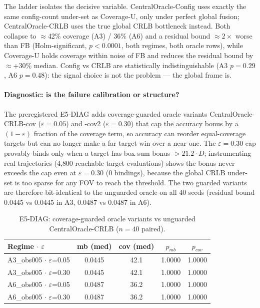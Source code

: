 \documentclass[journal]{IEEEtran}
\newcommand{\CU}{Coverage-U}
\begin{document}
The ladder isolates the decisive variable. CentralOracle-Config uses
exactly the same config-count under-set as \CU, only under perfect global
fusion; CentralOracle-CRLB uses the true global CRLB bottleneck instead. Both
collapse to $\approx$42\% coverage (A3) / 36\% (A6) and a residual bound
$\approx 2\times$ worse than FB (Holm-significant, $p < 0.0001$, both regimes,
both oracle rows), while \CU{} holds coverage within noise of FB and reduces
the residual bound by $\approx$+30\% median. Config vs CRLB are statistically
indistinguishable (A3 $p = 0.29$, A6 $p = 0.48$): the signal choice is not the
problem --- the global frame is.

\paragraph{Diagnostic: is the failure calibration or structure?}
The preregistered E5-DIAG adds coverage-guarded oracle variants
CentralOracle-CRLB-cov ($\varepsilon = 0.05$) and -cov2 ($\varepsilon = 0.30$)
that cap the accuracy bonus by a $(1 - \varepsilon)$ fraction of the coverage
term, so accuracy can reorder equal-coverage targets but can no longer make a
far target win over a near one. The $\varepsilon = 0.30$ cap provably binds
only when a target has box-sum bonus $> 21.2 \cdot D$; instrumenting real
trajectories (4{,}800 reachable-target evaluations) shows the bonus never
exceeds the cap even at $\varepsilon = 0.30$ (0 bindings), because the global
CRLB under-set is too sparse for any FOV to reach the threshold. The two
guarded variants are therefore bit-identical to the unguarded oracle on all 40
seeds (residual bound 0.0445 vs 0.0445 in A3, 0.0487 vs 0.0487 in A6).

\begin{table}[t]
\caption{E5-DIAG: coverage-guarded oracle variants vs unguarded CentralOracle-CRLB ($n = 40$ paired).}
\label{tab:e5diag}
\centering
\begin{tabular}{l c c c c}
\toprule
Regime $\cdot$ $\varepsilon$ & mb (med) & cov (med) & $p_{mb}$ & $p_{cov}$ \\
\midrule
A3\_obs005  $\cdot$  $\varepsilon$=0.05 & 0.0445 & 42.1 & 1.0000 & 1.0000 \\
A3\_obs005  $\cdot$  $\varepsilon$=0.30 & 0.0445 & 42.1 & 1.0000 & 1.0000 \\
A6\_obs005  $\cdot$  $\varepsilon$=0.05 & 0.0487 & 36.2 & 1.0000 & 1.0000 \\
A6\_obs005  $\cdot$  $\varepsilon$=0.30 & 0.0487 & 36.2 & 1.0000 & 1.0000 \\
\bottomrule
\end{tabular}
\end{table}
\end{document}
